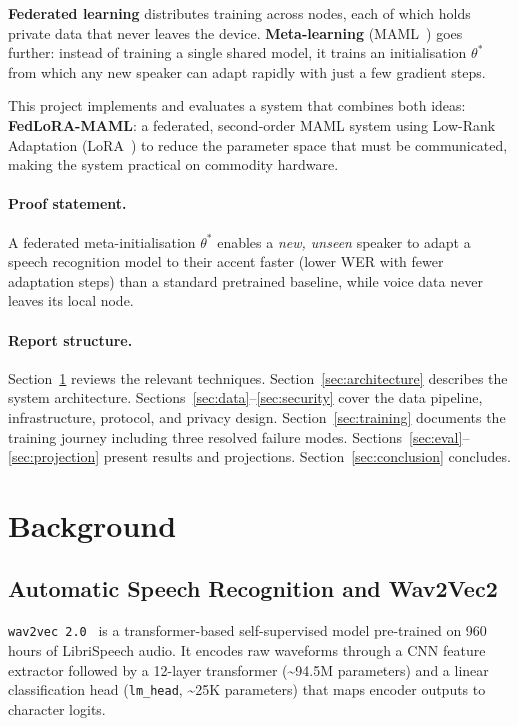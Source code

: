 \documentclass[12pt]{article}
\theoremstyle{plain}
\begin{document}
\textbf{Federated learning} distributes training across nodes, each of which holds
private data that never leaves the device.
\textbf{Meta-learning} (MAML~\cite{finn2017maml}) goes further: instead of
training a single shared model, it trains an initialisation $\theta^*$ from which
any new speaker can adapt rapidly with just a few gradient steps.

This project implements and evaluates a system that combines both ideas:
\textbf{FedLoRA-MAML}: a federated, second-order MAML system using
Low-Rank Adaptation (LoRA~\cite{hu2022lora}) to reduce the parameter space
that must be communicated, making the system practical on commodity hardware.

\paragraph{Proof statement.} 
A federated meta-initialisation $\theta^*$ enables a \emph{new, unseen} speaker to
adapt a speech recognition model to their accent faster (lower WER with fewer
adaptation steps) than a standard pretrained baseline, while voice data never
leaves its local node.

\paragraph{Report structure.}
Section~\ref{sec:background} reviews the relevant techniques.
Section~\ref{sec:architecture} describes the system architecture.
Sections~\ref{sec:data}--\ref{sec:security} cover the data pipeline,
infrastructure, protocol, and privacy design.
Section~\ref{sec:training} documents the training journey including three
resolved failure modes.
Sections~\ref{sec:eval}--\ref{sec:projection} present results and projections.
Section~\ref{sec:conclusion} concludes.

\section{Background}
\label{sec:background}

\subsection{Automatic Speech Recognition and Wav2Vec2}

\texttt{wav2vec~2.0}~\cite{baevski2020wav2vec2} is a transformer-based
self-supervised model pre-trained on 960 hours of LibriSpeech audio.
It encodes raw waveforms through a CNN feature extractor followed by a 12-layer
transformer (\textasciitilde94.5M parameters) and a linear classification head
(\texttt{lm\_head}, \textasciitilde25K parameters) that maps encoder outputs to
character logits.
\end{document}
